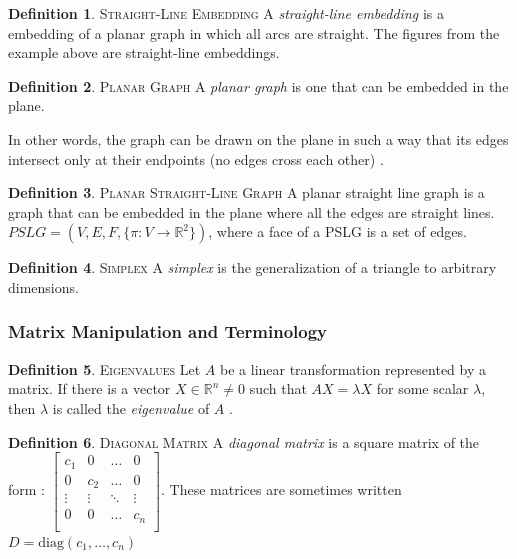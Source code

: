\documentclass[11pt]{article}
\newcommand{\R}{\mathbb{R}}
\theoremstyle{definition}
\newtheorem{definition}{Definition}[section]
\begin{document}
	\theoremstyle{definition}
	\begin{definition}{\textsc{Straight-Line Embedding}}
		A \emph{straight-line embedding} is a embedding of a planar graph in which all arcs are straight. The figures from the example above are straight-line embeddings.
  	\end{definition}
	
	\theoremstyle{definition}
	\begin{definition}{\textsc{Planar Graph}}
		A \emph{planar graph} is one that can be embedded in the plane.
	\end{definition}
	
	In other words, the graph can be drawn on the plane in such a way that its edges intersect only at their endpoints (no edges cross each other) \cite{mathworld:PlanarGraph}.
	
	\theoremstyle{definition}
	\begin{definition}{\textsc{Planar Straight-Line Graph}}
		A planar straight line graph is a graph that can be embedded in the plane where all the edges are straight lines. $PSLG = (V,E,F, \{\pi : V \rightarrow \R^2 \})$, where a face of a PSLG is a set of edges.
	\end{definition}
	
	\theoremstyle{definition}
	\begin{definition}{\textsc{Simplex}}
		A \emph{simplex} is the generalization of a triangle to arbitrary dimensions.
	\end{definition}

\subsubsection{Matrix Manipulation and Terminology}

	\theoremstyle{definition}
	\begin{definition}{\textsc{Eigenvalues}}
		Let $A$ be a linear transformation represented by a matrix. If there is a vector $X \in \R^n \neq 0$ such that $AX = \lambda X$ for some scalar $\lambda$, then $\lambda$ is called the \emph{eigenvalue} of $A$ \cite{mathworld:Eigenvalue}.
	\end{definition}
	
	\theoremstyle{definition}
	\begin{definition}{\textsc{Diagonal Matrix}}
		A \emph{diagonal matrix} is a square matrix of the form \cite{mathworld:DiagonalMatrix}:
		$\begin{bmatrix}
			c_1 & 0 & \dots & 0 \\
			0 & c_2 & \dots & 0 \\
			\vdots & \vdots  & \ddots  & \vdots \\
			0 & 0 & \dots & c_n \\
		\end{bmatrix}$. These matrices are sometimes written $D = \text{diag}(c_1, \dots, c_n)$
	\end{definition}
	
\end{document}
